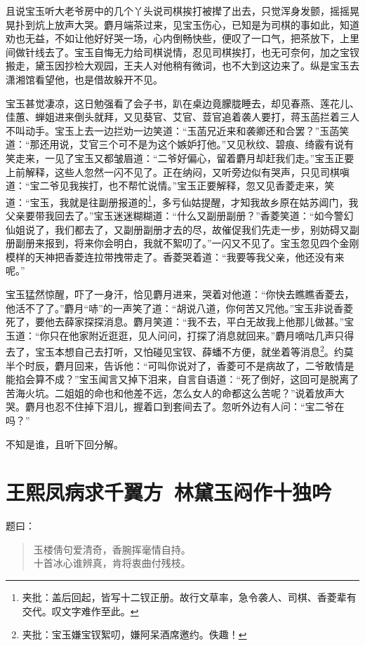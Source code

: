 \documentclass[12pt,oneside]{book}
\newenvironment{shici}{%
\begin{verse}%
\centering\large\hspace{12pt}}%
{\end{verse}}
\begin{document}
且说宝玉听大老爷房中的几个丫头说司棋挨打被撵了出去，只觉浑身发颤，摇摇晃晃扑到炕上放声大哭。麝月端茶过来，见宝玉伤心，已知是为司棋的事如此，知道劝也无益，不如让他好好哭一场，心内倒畅快些，便叹了一口气，把茶放下，上里间做针线去了。宝玉自悔无力给司棋说情，忍见司棋挨打，也无可奈何，加之宝钗搬走，黛玉因抄检大观园，王夫人对他稍有微词，也不大到这边来了。纵是宝玉去潇湘馆看望他，也是借故躲开不见。

宝玉甚觉凄凉，这日勉强看了会子书，趴在桌边竟朦胧睡去，却见春燕、莲花儿、佳蕙、蝉姐进来倒头就拜，又见葵官、艾官、荳官追着袭人要打，蒋玉菡拦着三人不叫动手。宝玉上去一边拦劝一边笑道：“玉菡兄近来和袭卿还和合罢？”玉菡笑道：“那还用说，艾官三个可不是为这个嫉妒打他。”又见秋纹、碧痕、绮霰有说有笑走来，一见了宝玉又都皱眉道：“二爷好偏心，留着麝月却赶我们走。”宝玉正要上前解释，这些人忽然一闪不见了。正在纳闷，又听旁边似有哭声，只见司棋嗔道：“宝二爷见我挨打，也不帮忙说情。”宝玉正要解释，忽又见香菱走来，笑道：“宝玉，我就是往副册报道的\footnote{夹批：盖后回起，皆写十二钗正册。故行文草率，急令袭人、司棋、香菱辈有交代。叹文字难作至此。}，多亏仙姑提醒，才知我故乡原在姑苏阊门，我父亲要带我回去了。”宝玉迷迷糊糊道：“什么又副册副册？”香菱笑道：“如今警幻仙姐说了，我们都去了，又副册副册才去的尽，故催促我们先走一步，别妨碍又副册副册来报到，将来你会明白，我就不絮叨了。”一闪又不见了。宝玉忽见四个金刚模样的天神把香菱连拉带拽带走了。香菱哭着道：“我要等我父亲，他还没有来呢。”

宝玉猛然惊醒，吓了一身汗，恰见麝月进来，哭着对他道：“你快去瞧瞧香菱去，他活不了了。”麝月“哧”的一声笑了道：“胡说八道，你何苦又咒他。”宝玉非说香菱死了，要他去薛家探探消息。麝月笑道：“我不去，平白无故我上他那儿做甚。”宝玉道：“你只在他家附近逛逛，见人问问，打探了消息就回来。”麝月嘀咕几声只得去了，宝玉本想自己去打听，又怕碰见宝钗、薛蟠不方便，就坐着等消息\footnote{夹批：宝玉嫌宝钗絮叨，嫌阿呆酒席邀约。佚趣！}。约莫半个时辰，麝月回来，告诉他：“可叫你说对了，香菱可不是病故了，二爷敢情是能掐会算不成？”宝玉闻言又掉下泪来，自言自语道：“死了倒好，这回可是脱离了苦海火坑。二姐姐的命也和他差不远，怎么女人的命都这么苦呢？”说着放声大哭。麝月也忍不住掉下泪儿，握着口到套间去了。忽听外边有人问：“宝二爷在吗？”

不知是谁，且听下回分解。

 
\chapter{王熙凤病求千翼方~林黛玉闷作十独吟}
题曰：
\begin{shici}
玉楼倩句爱清奇，香腕挥毫情自持。\\
十首冰心谁辨真，肯将衷曲付残枝。
\end{shici}
\end{document}
